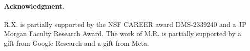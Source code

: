 \documentclass{article}
\begin{document}
\paragraph{Acknowledgment.} R.X. is partially supported by the NSF CAREER award DMS-2339240 and a JP
Morgan Faculty Research Award. The work of M.R. is partially supported by a gift from Google Research and a gift from Meta.










%
%
%
%
%
%
%
%
%
%
\end{document}
